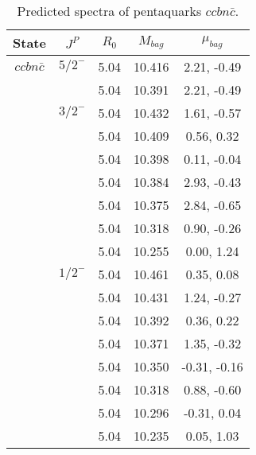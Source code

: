 \documentclass[prd,twocolumn,floatfix,nofootinbib]{revtex4}
\begin{document}
\renewcommand{\tabcolsep}{0.5cm}
\renewcommand{\arraystretch}{1.2}
\begin{table*}[!htbp]
    \caption{Predicted spectra of pentaquarks $ccbn\bar{c}$.}
    \begin{tabular}{ccccc}
        \hline\hline
        {\rm State} &$J^{P}$ &$R_{0}$ &$M_{bag}$ &$\mu_{bag}$ \\ \hline
        ${ccbn\bar{c}}$
            &${5/2}^{-}$    &5.04   &10.416 &2.21, -0.49 \\
            &               &5.04   &10.391 &2.21, -0.49 \\
            &${3/2}^{-}$    &5.04   &10.432 &1.61, -0.57 \\
            &               &5.04   &10.409 &0.56, 0.32 \\
            &               &5.04   &10.398 &0.11, -0.04 \\
            &               &5.04   &10.384 &2.93, -0.43 \\
            &               &5.04   &10.375 &2.84, -0.65 \\
            &               &5.04   &10.318 &0.90, -0.26 \\
            &               &5.04   &10.255 &0.00, 1.24 \\
            &${1/2}^{-}$    &5.04   &10.461 &0.35, 0.08 \\
            &               &5.04   &10.431 &1.24, -0.27 \\
            &               &5.04   &10.392 &0.36, 0.22 \\
            &               &5.04   &10.371 &1.35, -0.32 \\
            &               &5.04   &10.350 &-0.31, -0.16 \\
            &               &5.04   &10.318 &0.88, -0.60 \\
            &               &5.04   &10.296 &-0.31, 0.04 \\
            &               &5.04   &10.235 &0.05, 1.03 \\
        \hline\hline 
    \end{tabular}
\end{table*}
\end{document}
